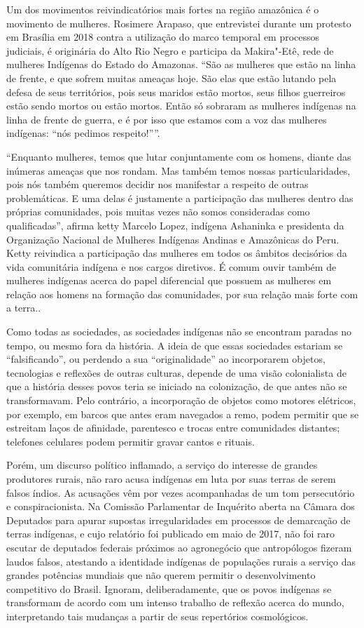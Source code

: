Um dos movimentos reivindicatórios mais fortes na região amazônica é o
movimento de mulheres. Rosimere Arapaso, que entrevistei durante um
protesto em Brasília em 2018 contra a utilização do marco temporal em
processos judiciais, é originária do Alto Rio Negro e participa da
Makira"-Etê, rede de mulheres Indígenas do Estado do Amazonas. ``São as
mulheres que estão na linha de frente, e que sofrem muitas ameaças hoje.
São elas que estão lutando pela defesa de seus territórios, pois seus
maridos estão mortos, seus filhos guerreiros estão sendo mortos ou estão
mortos. Então só sobraram as mulheres indígenas na linha de frente de
guerra, e é por isso que estamos com a voz das mulheres indígenas: ``nós
pedimos respeito!''''.

``Enquanto mulheres, temos que lutar conjuntamente com os homens, diante
das inúmeras ameaças que nos rondam. Mas também temos nossas
particularidades, pois nós também queremos decidir nos manifestar a
respeito de outras problemáticas. E uma delas é justamente a
participação das mulheres dentro das próprias comunidades, pois muitas
vezes não somos consideradas como qualificadas'', afirma ketty Marcelo
Lopez, indígena Ashaninka e presidenta da Organização Nacional de
Mulheres Indígenas Andinas e Amazônicas do Peru. Ketty reivindica a
participação das mulheres em todos os âmbitos decisórios da vida
comunitária indígena e nos cargos diretivos. É comum ouvir também de
mulheres indígenas acerca do papel diferencial que possuem as mulheres
em relação aos homens na formação das comunidades, por sua relação mais
forte com a terra..

Como todas as sociedades, as sociedades indígenas não se encontram
paradas no tempo, ou mesmo fora da história. A ideia de que essas
sociedades estariam se ``falsificando'', ou perdendo a sua
``originalidade'' ao incorporarem objetos, tecnologias e reflexões de
outras culturas, depende de uma visão colonialista de que a história
desses povos teria se iniciado na colonização, de que antes não se
transformavam. Pelo contrário, a incorporação de objetos como motores
elétricos, por exemplo, em barcos que antes eram navegados a remo, podem
permitir que se estreitam laços de afinidade, parentesco e trocas entre
comunidades distantes; telefones celulares podem permitir gravar cantos
e rituais.

Porém, um discurso político inflamado, a serviço do interesse de grandes
produtores rurais, não raro acusa indígenas em luta por suas terras de
serem falsos índios. As acusações vêm por vezes acompanhadas de um tom
persecutório e conspiracionista. Na Comissão Parlamentar de Inquérito
aberta na Câmara dos Deputados para apurar supostas irregularidades em
processos de demarcação de terras indígenas, e cujo relatório foi
publicado em maio de 2017, não foi raro escutar de deputados federais
próximos ao agronegócio que antropólogos fizeram laudos falsos,
atestando a identidade indígenas de populações rurais a serviço das
grandes potências mundiais que não querem permitir o desenvolvimento
competitivo do Brasil. Ignoram, deliberadamente, que os povos indígenas
se transformam de acordo com um intenso trabalho de reflexão acerca do
mundo, interpretando tais mudanças a partir de seus repertórios
cosmológicos.

